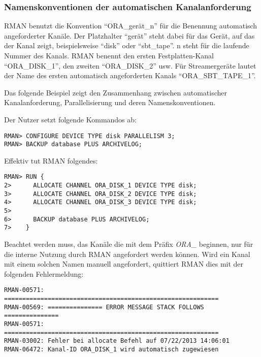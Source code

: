         \subsubsection{Namenskonventionen der automatischen Kanalanforderung}
          RMAN benutzt die Konvention \enquote{ORA\_ger\"at\_n} f\"ur die Benennung automatisch angeforderter Kan\"ale. Der Platzhalter \enquote{ger\"at} steht dabei f\"ur das Ger\"at, auf das der Kanal zeigt, beispielsweise \enquote{disk} oder \enquote{sbt\_tape}. n steht f\"ur die laufende Nummer des Kanals. RMAN benennt den ersten Festplatten-Kanal \enquote{ORA\_DISK\_1}, den zweiten \enquote{ORA\_DISK\_2} usw. F\"ur Streamerger\"ate lautet der Name des ersten automatisch angeforderten Kanals \enquote{ORA\_SBT\_TAPE\_1}.

          Das folgende Beispiel zeigt den Zusammenhang zwischen automatischer Kanalanforderung, Parallelisierung und deren Namenskonventionen.

          Der Nutzer setzt folgende Kommandos ab:
          \begin{lstlisting}[caption={Namenskonventionen f\"ur RMAN-Kan\"ale},label=admin1022,language=rman]
RMAN> CONFIGURE DEVICE TYPE disk PARALLELISM 3;
RMAN> BACKUP database PLUS ARCHIVELOG;
          \end{lstlisting}
          Effektiv tut RMAN folgendes:
          \begin{lstlisting}[caption={Namenskonventionen f\"ur vordefinierte RMAN-Kan\"ale 2},label=admin1023,language=rman]
RMAN> RUN {
2>      ALLOCATE CHANNEL ORA_DISK_1 DEVICE TYPE disk;
3>      ALLOCATE CHANNEL ORA_DISK_2 DEVICE TYPE disk;
4>      ALLOCATE CHANNEL ORA_DISK_3 DEVICE TYPE disk;
5>
6>      BACKUP database PLUS ARCHIVELOG;
7>    }
          \end{lstlisting}
\clearpage
          \begin{merke}
            Beachtet werden muss, das Kan\"ale die mit dem Pr\"afix \textit{ORA\_} beginnen, nur f\"ur die interne Nutzung durch RMAN angefordert werden k\"onnen. Wird ein Kanal mit einem solchen Namen manuell angefordert, quittiert RMAN dies mit der folgenden Fehlermeldung:
\begin{verbatim}
RMAN-00571: ===========================================================
RMAN-00569: =============== ERROR MESSAGE STACK FOLLOWS ===============
RMAN-00571: ===========================================================
RMAN-03002: Fehler bei allocate Befehl auf 07/22/2013 14:06:01
RMAN-06472: Kanal-ID ORA_DISK_1 wird automatisch zugewiesen
\end{verbatim}
          \end{merke}
